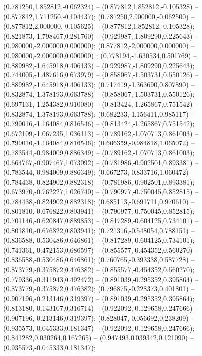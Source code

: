  (0.781250,1.852812,-0.062324) -- (0.877812,1.852812,-0.105328) -- (0.877812,1.711250,-0.104437);
 (0.781250,2.000000,-0.062500) -- (0.877812,2.000000,-0.105625) -- (0.877812,1.852812,-0.105328);
 (0.821873,-1.798467,0.281760) -- (0.929987,-1.809290,0.225643) -- (0.980000,-2.000000,0.000000);
 (0.877812,-2.000000,0.000000) -- (0.980000,-2.000000,0.000000) ;
 (0.778194,-1.630534,0.501769) -- (0.889982,-1.645918,0.406133) -- (0.929987,-1.809290,0.225643);
 (0.744005,-1.487616,0.673979) -- (0.858067,-1.503731,0.550126) -- (0.889982,-1.645918,0.406133);
 (0.717419,-1.363690,0.807890) -- (0.832874,-1.378193,0.663788) -- (0.858067,-1.503731,0.550126);
 (0.697131,-1.254382,0.910080) -- (0.813424,-1.265867,0.751542) -- (0.832874,-1.378193,0.663788);
 (0.682233,-1.156411,0.985117) -- (0.799016,-1.164084,0.816546) -- (0.813424,-1.265867,0.751542);
 (0.672109,-1.067235,1.036113) -- (0.789162,-1.070713,0.861003) -- (0.799016,-1.164084,0.816546);
 (0.666359,-0.984818,1.065072) -- (0.783544,-0.984009,0.886349) -- (0.789162,-1.070713,0.861003);
 (0.664767,-0.907467,1.073092) -- (0.781986,-0.902501,0.893381) -- (0.783544,-0.984009,0.886349);
 (0.667273,-0.833716,1.060472) -- (0.784438,-0.824902,0.882318) -- (0.781986,-0.902501,0.893381);
 (0.673970,-0.762227,1.026740) -- (0.790977,-0.750045,0.852815) -- (0.784438,-0.824902,0.882318);
 (0.685113,-0.691711,0.970610) -- (0.801810,-0.676822,0.803941) -- (0.790977,-0.750045,0.852815);
 (0.701146,-0.620847,0.889853) -- (0.817289,-0.604125,0.734101) -- (0.801810,-0.676822,0.803941);
 (0.721316,-0.548054,0.788151) -- (0.836588,-0.530486,0.646861) -- (0.817289,-0.604125,0.734101);
 (0.741361,-0.472153,0.686597) -- (0.855577,-0.454352,0.560270) -- (0.836588,-0.530486,0.646861);
 (0.760765,-0.393338,0.587728) -- (0.873779,-0.375872,0.476382) -- (0.855577,-0.454352,0.560270);
 (0.779336,-0.311943,0.492472) -- (0.891039,-0.295352,0.395864) -- (0.873779,-0.375872,0.476382);
 (0.796875,-0.228373,0.401801) -- (0.907196,-0.213146,0.319397) -- (0.891039,-0.295352,0.395864);
 (0.813180,-0.143107,0.316714) -- (0.922092,-0.129658,0.247666) -- (0.907196,-0.213146,0.319397);
 (0.828047,-0.056692,0.238209) -- (0.935573,-0.045333,0.181347) -- (0.922092,-0.129658,0.247666);
 (0.841282,0.030264,0.167265) -- (0.947493,0.039342,0.121090) -- (0.935573,-0.045333,0.181347);

